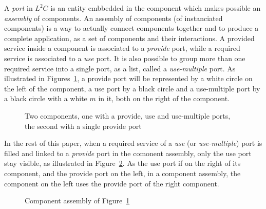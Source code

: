 A \emph{port} in $L^2C$ is an entity embbedded in the component which makes possible an \emph{assembly} of components. An assembly of components (of instanciated components) is a way to actually connect components together and to produce a complete application, as a set of components and their interactions. A provided service inside a component is associated to a \emph{provide} port, while a required service is associated to a \emph{use} port. It is also possible to group more than one required service into a single port, as a list, called a \emph{use-multiple} port. As illustrated in Figures~\ref{fig:ports}, a provide port will be represented by a white circle on the left of the component, a use port by a black circle and a use-multiple port by a black circle with a white $m$ in it, both on the right of the component.

\begin{figure}[h!]
\begin{center}
\caption{Two components, one with a provide, use and use-multiple ports, the second with a single provide port}
\label{fig:ports}
\end{center}
\end{figure}

In the rest of this paper, when a required service of a \emph{use} (or \emph{use-multiple}) port is filled and linked to a \emph{provide} port in the comonent assembly, only the use port stay visible, as illustrated in Figure~\ref{fig:assembly}. As the use port if on the right of its component, and the provide port on the left, in a component assembly, the component on the left uses the provide port of the right component.

\begin{figure}[h!]
\begin{center}
\caption{Component assembly of Figure~\ref{fig:ports}}
\label{fig:assembly}
\end{center}
\end{figure}

